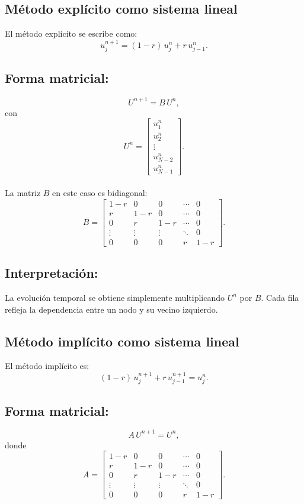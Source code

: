 \documentclass[12pt,a4paper]{article}
\begin{document}
\subsection{Método explícito como sistema lineal}

El método explícito se escribe como:
\[
u_j^{n+1} = (1-r)\,u_j^n + r\,u_{j-1}^n.
\]

\subsection*{Forma matricial:}
\[
U^{n+1} = B\,U^n,
\]
con
\[
U^n = 
\begin{bmatrix}
u_1^n \\[4pt] u_2^n \\[4pt] \vdots \\[4pt] u_{N-2}^n \\[4pt] u_{N-1}^n
\end{bmatrix}.
\] \\

La matriz $B$ en este caso es bidiagonal:
\[
B = 
\begin{bmatrix}
1-r & 0   & 0   & \cdots & 0 \\[4pt]
r   & 1-r & 0   & \cdots & 0 \\[4pt]
0   & r   & 1-r & \cdots & 0 \\[4pt]
\vdots & \vdots & \vdots & \ddots & 0 \\[4pt]
0   & 0   & 0   & r      & 1-r
\end{bmatrix}.
\]

\subsection*{Interpretación:}
La evolución temporal se obtiene simplemente multiplicando $U^n$ por $B$. Cada fila refleja la dependencia entre un nodo y su vecino izquierdo.

\subsection{Método implícito como sistema lineal}

El método implícito es:
\[
(1-r)\,u_j^{n+1} + r\,u_{j-1}^{n+1} = u_j^n.
\]

\subsection*{Forma matricial:}
\[
A\,U^{n+1} = U^n,
\]
donde
\[
A = 
\begin{bmatrix}
1-r & 0   & 0   & \cdots & 0 \\[4pt]
r   & 1-r & 0   & \cdots & 0 \\[4pt]
0   & r   & 1-r & \cdots & 0 \\[4pt]
\vdots & \vdots & \vdots & \ddots & 0 \\[4pt]
0   & 0   & 0   & r      & 1-r
\end{bmatrix}.
\]
\end{document}
